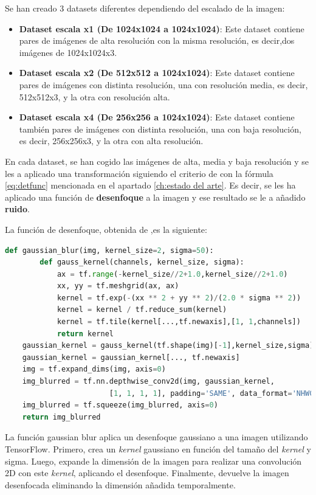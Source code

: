 Se han creado 3 datasets diferentes dependiendo del escalado de la imagen:

\begin{itemize}
	\item \textbf{Dataset escala x1 (De 1024x1024 a 1024x1024)}: Este dataset contiene pares de imágenes de alta resolución con la misma resolución, es decir,dos imágenes de 1024x1024x3.
	\item \textbf{Dataset escala x2 (De 512x512 a 1024x1024)}: Este dataset contiene pares de imágenes con distinta resolución, una con resolución media, es decir, 512x512x3, y la otra con resolución alta.
	\item \textbf{Dataset escala x4 (De 256x256 a 1024x1024)}: Este dataset contiene también pares de imágenes con distinta resolución, una con baja resolución, es decir, 256x256x3, y la otra con alta resolución.
\end{itemize}


En cada dataset, se han cogido las imágenes de alta, media y baja resolución y se les a aplicado una transformación siguiendo el criterio de \cite{Wavelet,OWLNet} con la fórmula \ref{eq:detfunc} mencionada en el apartado \ref{ch:estado del arte}. Es decir, se les ha aplicado una función de \textbf{desenfoque} a la imagen y ese resultado se le a añadido \textbf{ruido}.

La función de desenfoque, obtenida de \cite{blzq2023gist},es la siguiente:

\begin{lstlisting}[language=python]
	def gaussian_blur(img, kernel_size=2, sigma=50):
		def gauss_kernel(channels, kernel_size, sigma):
			ax = tf.range(-kernel_size//2+1.0,kernel_size//2+1.0)
			xx, yy = tf.meshgrid(ax, ax)
			kernel = tf.exp(-(xx ** 2 + yy ** 2)/(2.0 * sigma ** 2))
			kernel = kernel / tf.reduce_sum(kernel)
			kernel = tf.tile(kernel[...,tf.newaxis],[1, 1,channels])
			return kernel
	gaussian_kernel = gauss_kernel(tf.shape(img)[-1],kernel_size,sigma)
	gaussian_kernel = gaussian_kernel[..., tf.newaxis]
	img = tf.expand_dims(img, axis=0)  
	img_blurred = tf.nn.depthwise_conv2d(img, gaussian_kernel,
						[1, 1, 1, 1], padding='SAME', data_format='NHWC')
	img_blurred = tf.squeeze(img_blurred, axis=0)  
	return img_blurred
\end{lstlisting}

La función gaussian blur aplica un desenfoque gaussiano a una imagen utilizando TensorFlow. Primero, crea un \textit{kernel} gaussiano en función del tamaño del  \textit{kernel} y sigma. Luego, expande la dimensión de la imagen para realizar una convolución 2D con este  \textit{kernel}, aplicando el desenfoque. Finalmente, devuelve la imagen desenfocada eliminando la dimensión añadida temporalmente.

